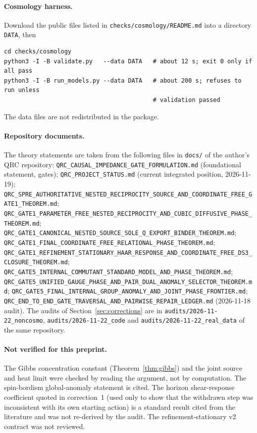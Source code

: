 \documentclass[11pt]{article}
\theoremstyle{definition}
\theoremstyle{remark}
\newcommand{\doc}[1]{\nolinkurl{#1}}
\begin{document}
\paragraph{Cosmology harness.} Download the public files listed in
\texttt{checks/cosmology/README.md} into a directory \texttt{DATA}, then
\begin{verbatim}
cd checks/cosmology
python3 -I -B validate.py   --data DATA   # about 12 s; exit 0 only if all pass
python3 -I -B run_models.py --data DATA   # about 200 s; refuses to run unless
                                          # validation passed
\end{verbatim}
The data files are not redistributed in the package.

\paragraph{Repository documents.} The theory statements are taken from the following
files in \texttt{docs/} of the author's QRC repository: {\footnotesize
\doc{QRC_CAUSAL_IMPEDANCE_GATE_FORMULATION.md} (foundational statement, gates);
\doc{QRC_PROJECT_STATUS.md} (current integrated position, 2026-11-19);
\doc{QRC_SPRE_AUTHORITATIVE_NESTED_RECIPROCITY_SOURCE_AND_COORDINATE_FREE_GATE1_THEOREM.md};
\doc{QRC_GATE1_PARAMETER_FREE_NESTED_RECIPROCITY_AND_CUBIC_DIFFUSIVE_PHASE_THEOREM.md};
\doc{QRC_GATE1_CANONICAL_NESTED_SOURCE_SOLE_Q_EXPORT_BINDER_THEOREM.md};
\doc{QRC_GATE1_FINAL_COORDINATE_FREE_RELATIONAL_PHASE_THEOREM.md};
\doc{QRC_GATE1_REFINEMENT_STATIONARY_HAAR_RESPONSE_AND_COORDINATE_FREE_DS3_CLOSURE_THEOREM.md};
\doc{QRC_GATE5_INTERNAL_COMMUTANT_STANDARD_MODEL_AND_PHASE_THEOREM.md};
\doc{QRC_GATE5_UNIFIED_GAUGE_PHASE_AND_PAIR_DUAL_ANOMALY_SELECTOR_THEOREM.md};
\doc{QRC_GATE5_FINAL_INTERNAL_GROUP_ANOMALY_AND_JOINT_PHASE_FRONTIER.md};
\doc{QRC_END_TO_END_GATE_TRAVERSAL_AND_PAIRWISE_REPAIR_LEDGER.md} (2026-11-18 audit).}
The audits of Section~\ref{sec:corrections} are in \texttt{audits/2026-11-22\_noncosmo},
\texttt{audits/2026-11-22\_code} and \texttt{audits/2026-11-22\_real\_data} of the same
repository.

\paragraph{Not verified for this preprint.} The Gibbs concentration constant
(Theorem~\ref{thm:gibbs}) and the joint source and heat limit were checked by reading the
argument, not by computation. The spin-bordism global-anomaly statement is cited. The
horizon shear-response coefficient quoted in correction~1 (used only to show that the
withdrawn step was inconsistent with its own starting action) is a standard result cited
from the literature and was not re-derived by the audit. The refinement-stationary v2 contract
was not reviewed.
\end{document}
